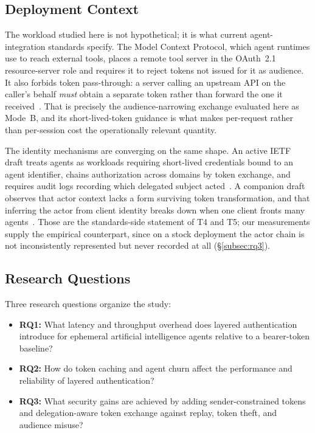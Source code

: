 \documentclass[conference]{IEEEtran}
\begin{document}
\subsection{Deployment Context}
\label{subsec:context}

The workload studied here is not hypothetical; it is what current agent-integration standards specify. The Model Context Protocol, which agent runtimes use to reach external tools, places a remote tool server in the OAuth~2.1 resource-server role and requires it to reject tokens not issued for it as audience. It also forbids token pass-through: a server calling an upstream API on the caller's behalf \emph{must} obtain a separate token rather than forward the one it received~\cite{mcp_authorization_2025}. That is precisely the audience-narrowing exchange evaluated here as Mode~B, and its short-lived-token guidance is what makes per-request rather than per-session cost the operationally relevant quantity.

The identity mechanisms are converging on the same shape. An active IETF draft treats agents as workloads requiring short-lived credentials bound to an agent identifier, chains authorization across domains by token exchange, and requires audit logs recording which delegated subject acted~\cite{kasselman2026aiagent}. A companion draft observes that actor context lacks a form surviving token transformation, and that inferring the actor from client identity breaks down when one client fronts many agents~\cite{mcguinness2026actor}. Those are the standards-side statement of T4 and T5; our measurements supply the empirical counterpart, since on a stock deployment the actor chain is not inconsistently represented but never recorded at all (\S\ref{subsec:rq3}).

\subsection{Research Questions}
Three research questions organize the study:
\begin{itemize}
\item \textbf{RQ1:} What latency and throughput overhead does layered authentication introduce for ephemeral artificial intelligence agents relative to a bearer-token baseline?

\item \textbf{RQ2:} How do token caching and agent churn affect the performance and reliability of layered authentication?

\item \textbf{RQ3:} What security gains are achieved by adding sender-constrained tokens and delegation-aware token exchange against replay, token theft, and audience misuse?
\end{itemize}
\end{document}
